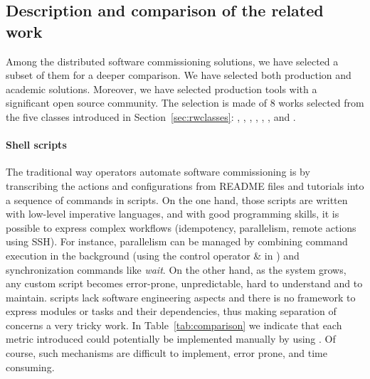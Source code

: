 \subsection{Description and comparison of the related work}

Among the distributed software commissioning solutions, we have selected a subset of them for a deeper comparison. We have selected both production and academic solutions. Moreover, we have selected production tools with a significant open source community.
%
The selection is made of 8 works selected from the five classes introduced in Section~\ref{sec:rwclasses}: \shell, \fractal, \ansible, \deployware, \aeolus, \juju, \tosca and \kubernetes.

\paragraph{Shell scripts}
The traditional way operators automate software commissioning is by transcribing the actions and configurations from README files and tutorials into a sequence of commands in \shell scripts. On the one hand, those scripts are written with low-level imperative languages, and with good programming skills, it is possible to express complex workflows (\eg idempotency, parallelism, remote actions using SSH). For instance, parallelism can be managed by combining command execution in
the background (\eg using the control operator \& in \bash) and synchronization commands like \emph{wait}. On the other hand, as the system grows, any custom script becomes error-prone, unpredictable, hard to understand and to maintain. \shell scripts lack software engineering aspects and there is no framework to express modules or tasks and their dependencies, thus making separation of concerns a very tricky work. In Table~\ref{tab:comparison} we indicate that each
metric introduced could potentially be implemented manually by using \shell. Of course, such mechanisms are difficult to implement, error prone, and time consuming.

